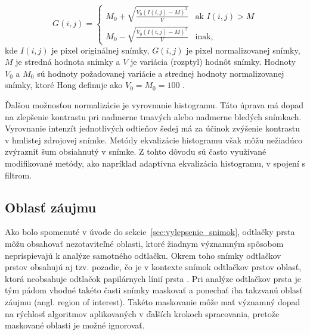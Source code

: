   \begin{equation}
    G(i,j) =
    \begin{cases}
      M_0 + \sqrt{\frac{V_0 (I(i,j)-M)^2}{V}}  & \text{ak } I(i,j) > M \\
      M_0 - \sqrt{\frac{V_0 (I(i,j)-M)^2}{V}} & \text{inak,}
    \end{cases}
    \label{eq:normalizacia_Hong}
  \end{equation}
  kde $I(i,j)$ je pixel originálnej snímky, $G(i,j)$ je pixel normalizovanej snímky, $M$ je stredná hodnota snímky a $V$ je variácia (rozptyl) hodnôt snímky.
  Hodnoty $V_0$ a $M_0$ sú hodnoty požadovanej variácie a strednej hodnoty normalizovanej snímky, ktoré Hong definuje ako $V_0 = M_0 = 100$ \cite{Hong}.

  Ďalšou možnosťou normalizácie je vyrovnanie histogramu. Táto úprava má dopad na zlepšenie kontrastu pri nadmerne tmavých
  alebo nadmerne bledých snímkach. Vyrovnanie intenzít jednotlivých odtieňov šedej má za účinok zvýšenie kontrastu v hmlistej zdrojovej snímke.
  Metódy ekvalizácie histogramu však môžu nežiadúco zvýrazniť šum obsiahnutý v snímke. Z tohto dôvodu sú často využívané modifikované metódy,
  ako napríklad adaptívna ekvalizácia histogramu, v spojení s filtrom.

  \subsection{Oblasť záujmu}
  Ako bolo spomenuté v úvode do sekcie~{\ref{sec:vylepsenie_snimok}}, odtlačky prsta môžu obsahovať nezotaviteľné oblasti, ktoré žiadnym významným spôsobom
  neprispievajú k analýze samotného odtlačku. Okrem toho snímky odtlačkov prstov obsahujú aj tzv. pozadie, čo je v kontexte snímok odtlačkov prstov oblasť,
  ktorá neobsahuje odtlačok papilárnych línií prsta \cite{Handbook}. Pri analýze odtlačkov prsta je tým pádom vhodné takéto časti snímky maskovať a ponechať
  iba takzvanú oblasť záujmu (angl. region of interest). Takéto maskovanie môže mať významný dopad na rýchlosť algoritmov aplikovaných v ďalších krokoch
  spracovania, pretože maskované oblasti je možné ignorovať.

